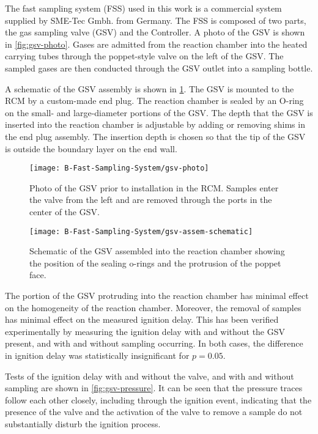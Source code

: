 \documentclass[../main.tex]{subfiles}
\begin{document}
The fast sampling system (FSS) used in this work is a commercial system supplied by
SME-Tec Gmbh. from Germany. The FSS is composed of two parts, the gas sampling valve
(GSV) and the Controller. A photo of the GSV is shown in \cref{fig:gsv-photo}.
Gases are admitted from the reaction chamber into the heated carrying tubes
through the poppet-style valve on the left of the GSV. The sampled gases are then
conducted through the GSV outlet into a sampling bottle.

A schematic of the GSV assembly is shown in \cref{fig:gsv-assem-schematic}.
The GSV is mounted to the RCM by a custom-made end plug. The reaction chamber
is sealed by an O-ring on the small- and large-diameter portions of the GSV.
The depth that the GSV is inserted into the reaction chamber is adjustable
by adding or removing shims in the end plug assembly. The insertion depth
is chosen so that the tip of the GSV is outside the boundary layer on the
end wall.

\begin{figure}
    \begin{floatrow}
        \ffigbox
            {\texttt{[image: B-Fast-Sampling-System/gsv-photo]}}
            {\caption{Photo of the GSV prior to installation in the RCM. Samples
            enter the valve from the left and are removed through the ports in the
            center of the GSV.}
            \label{fig:gsv-photo}}
        \ffigbox
            {\texttt{[image: B-Fast-Sampling-System/gsv-assem-schematic]}}
            {\caption{Schematic of the GSV assembled into the reaction chamber showing
            the position of the sealing o-rings and the protrusion of the poppet face.}
            \label{fig:gsv-assem-schematic}}
    \end{floatrow}
\end{figure}

The portion of the GSV protruding into the reaction chamber has minimal
effect on the homogeneity of the reaction chamber. Moreover, the removal of
samples has minimal effect on the measured ignition delay.
This has been verified experimentally by measuring the ignition delay with
and without the GSV present, and with and without sampling occurring.
In both cases, the difference in ignition delay was statistically insignificant
for $p=0.05$.

Tests of the ignition delay with and without the valve, and with and
without sampling are shown in \cref{fig:gsv-pressure}. It can be seen
that the pressure traces follow each other closely, including through the
ignition event, indicating that the presence of the valve and the
activation of the valve to remove a sample do not substantially disturb
the ignition process.
\end{document}
